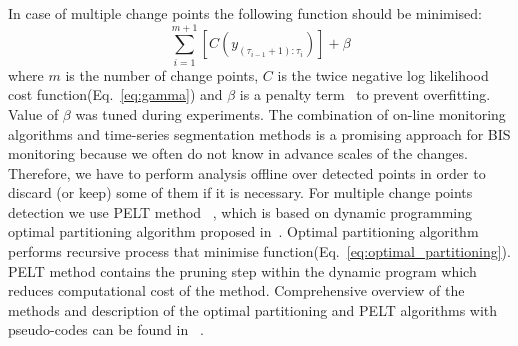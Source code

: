 In case of multiple change points the following function should be minimised:
\begin{equation}
\label{eq:optimal_partitioning}
\sum_{i=1}^{m+1}[C(y_{(\tau_{i-1}+1):\tau_{i}})] + \beta
\end{equation}
\noindent
where $m$ is the number of change points, $C$ is the twice negative
log likelihood cost function(Eq.~\ref{eq:gamma}) and $\beta$ is a
penalty term~\cite{KillickOptimalDetection} to prevent overfitting.
Value of $\beta$ was tuned during experiments.
%
%
The combination of on-line monitoring algorithms and time-series segmentation methods is a promising approach for BIS monitoring because we often do not know in advance scales of the changes. Therefore, we have to perform analysis offline over detected points in order to discard (or keep) some of them if it is necessary.
%
For multiple change points detection we use PELT method
~\cite{KillickOptimalDetection}, which is based on dynamic programming
optimal partitioning algorithm proposed in~\cite{Barnes}.
%
Optimal partitioning algorithm performs recursive process that minimise function(Eq.~\ref{eq:optimal_partitioning}).
%
PELT method contains the pruning step within the dynamic
program which reduces computational cost of the method.
%
Comprehensive overview of the methods and description of the optimal
partitioning and PELT algorithms with pseudo-codes can be found in
~\cite{KillickOptimalDetection, KillickRpackage}.
